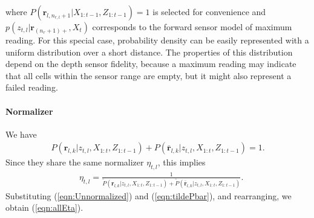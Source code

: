 \documentclass[smallextended]{svjour3}       %
\newcommand{\refeqn}[1]{(\ref{eqn:#1})}
\begin{document}
where $P(\mathbf{r}_{l,n_{r,l}+1}|X_{1:t-1},Z_{1:t-1})=1$ is selected for convenience and \\$p(z_{t,l}|\mathbf{r}_{(n_r+1)+},X_t)$ corresponds to the forward sensor model of maximum reading. For this special case, probability density can be easily represented with a uniform distribution over a short distance. The properties of this distribution depend on the depth sensor fidelity, because a maximum reading may indicate that all cells within the sensor range are empty, but it might also represent a failed reading.






\paragraph{Normalizer}
We have 
\begin{align*}
P(\mathbf{r}_{l,k}|z_{t,l},X_{1:t},Z_{1:t-1})+
P(\bar{\mathbf{r}}_{l,k}|z_{t,l},X_{1:t},Z_{1:t-1})=1.
\end{align*}
Since they share the same normalizer $\eta_{t,l}$, this implies 
\begin{align*}
&\eta_{t,l}=\frac1{\tilde P(\mathbf{r}_{l,k}|z_{t,l},X_{1:t},Z_{1:t-1})+
\tilde P(\bar{\mathbf{r}}_{l,k}|z_{t,l},X_{1:t},Z_{1:t-1})}.
\end{align*}
Substituting \refeqn{Unnormalized} and \refeqn{tildePbar}, and rearranging, we obtain \refeqn{allEta}.





\end{document}
